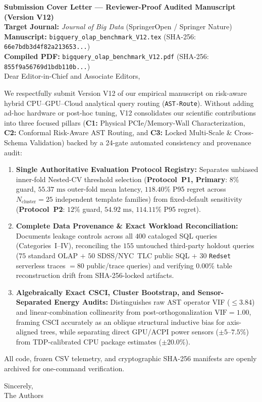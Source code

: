 \documentclass[11pt,a4paper]{article}
\begin{document}
\noindent\textbf{Submission Cover Letter --- Reviewer-Proof Audited Manuscript (Version V12)}\\[4pt]
\noindent\textbf{Target Journal:} \emph{Journal of Big Data} (SpringerOpen / Springer Nature)\\
\noindent\textbf{Manuscript:} \texttt{bigquery\_olap\_benchmark\_V12.tex} (SHA-256: \texttt{66e7bdb3d4f82a213653...})\\
\noindent\textbf{Compiled PDF:} \texttt{bigquery\_olap\_benchmark\_V12.pdf} (SHA-256: \texttt{855f9a56769d1bdb110b...})\\[8pt]
Dear Editor-in-Chief and Associate Editors,

We respectfully submit Version V12 of our empirical manuscript on risk-aware hybrid CPU--GPU--Cloud analytical query routing (\texttt{AST-Route}). Without adding ad-hoc hardware or post-hoc tuning, V12 consolidates our scientific contributions into three focused pillars (\textbf{C1:} Physical PCIe/Memory-Wall Characterization, \textbf{C2:} Conformal Risk-Aware AST Routing, and \textbf{C3:} Locked Multi-Scale \& Cross-Schema Validation) backed by a 24-gate automated consistency and provenance audit:
\begin{enumerate}
\item \textbf{Single Authoritative Evaluation Protocol Registry:} Separates unbiased inner-fold Nested-CV threshold selection (\textbf{Protocol~P1, Primary}: $8\%$ guard, $55.37\text{ ms}$ outer-fold mean latency, $118.40\%$ P95 regret across $N_{\text{cluster}}=25$ independent template families) from fixed-default sensitivity (\textbf{Protocol~P2}: $12\%$ guard, $54.92\text{ ms}$, $114.11\%$ P95 regret).
\item \textbf{Complete Data Provenance \& Exact Workload Reconciliation:} Documents leakage controls across all $400$ cataloged SQL queries (Categories~I--IV), reconciling the $155$ untouched third-party holdout queries ($75$ standard OLAP $+$ $50$ SDSS/NYC~TLC public SQL $+$ $30$ \texttt{Redset} serverless traces $= 80$ public/trace queries) and verifying $0.00\%$ table reconstruction drift from SHA-256-locked artifacts.
\item \textbf{Algebraically Exact CSCI, Cluster Bootstrap, and Sensor-Separated Energy Audits:} Distinguishes raw AST operator VIF ($\le 3.84$) and linear-combination collinearity from post-orthogonalization $\text{VIF}=1.00$, framing $\text{CSCI}$ accurately as an oblique structural inductive bias for axis-aligned trees, while separating direct GPU/ACPI power sensors ($\pm 5\text{--}7.5\%$) from TDP-calibrated CPU package estimates ($\pm 20.0\%$).
\end{enumerate}

All code, frozen CSV telemetry, and cryptographic SHA-256 manifests are openly archived for one-command verification.

Sincerely,\\[6pt]
The Authors
\end{document}
